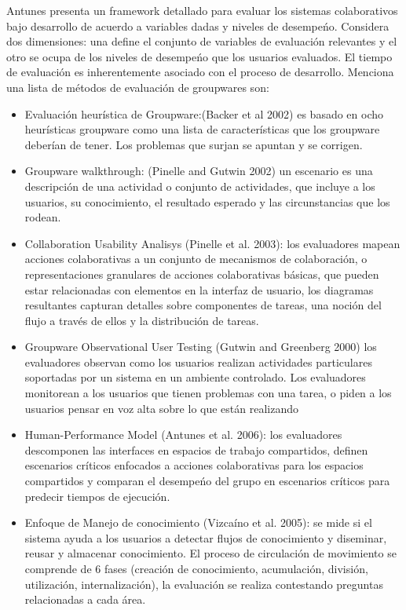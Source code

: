 Antunes\cite{antunes2008structuring} presenta un framework detallado para evaluar los sistemas colaborativos bajo desarrollo de acuerdo a variables dadas y niveles de desempe\'no. Considera dos dimensiones: una define el conjunto de variables de evaluaci\'on relevantes y el otro se ocupa de los niveles de desempe\'no que los usuarios evaluados. El tiempo de evaluaci\'on es inherentemente asociado con el proceso de desarrollo. Menciona una lista de m\'etodos de evaluaci\'on de groupwares son: 
\begin{itemize}
\item Evaluaci\'on heur\'istica de Groupware:(Backer et al 2002) es basado en ocho heur\'isticas groupware como una lista de caracter\'isticas que los groupware deber\'ian de tener. Los problemas que surjan se apuntan y se corrigen.
\item Groupware walkthrough: (Pinelle and Gutwin 2002) un escenario es una descripci\'on de una actividad o conjunto de actividades, que incluye a los usuarios, su conocimiento, el resultado esperado y las circunstancias que los rodean.
\item Collaboration Usability Analisys (Pinelle et al. 2003): los evaluadores mapean acciones colaborativas a un conjunto de mecanismos de colaboraci\'on, o representaciones granulares de acciones colaborativas b\'asicas, que pueden estar relacionadas con elementos en la interfaz de usuario, los diagramas resultantes capturan detalles sobre componentes de tareas, una noci\'on del flujo a trav\'es de ellos y la distribuci\'on de tareas.
\item Groupware Observational User Testing (Gutwin and Greenberg 2000) los evaluadores observan como los usuarios realizan actividades particulares soportadas por un sistema en un ambiente controlado. Los evaluadores monitorean a los usuarios que tienen problemas con una tarea, o piden a los usuarios pensar en voz alta sobre lo que est\'an realizando
\item Human-Performance Model (Antunes et al. 2006): los evaluadores descomponen las interfaces en espacios de trabajo compartidos, definen escenarios cr\'iticos enfocados a acciones colaborativas para los espacios compartidos y comparan el desempe\'no del grupo en escenarios cr\'iticos para predecir tiempos de ejecuci\'on.
\item Enfoque de Manejo de conocimiento (Vizca\'ino et al. 2005): se mide si el sistema ayuda a los usuarios a detectar flujos de conocimiento y diseminar, reusar y almacenar conocimiento. El proceso de circulaci\'on de movimiento se comprende de 6 fases (creaci\'on de conocimiento, acumulaci\'on, divisi\'on, utilizaci\'on, internalizaci\'on), la evaluaci\'on se realiza contestando preguntas relacionadas a cada \'area.
\end{itemize}
